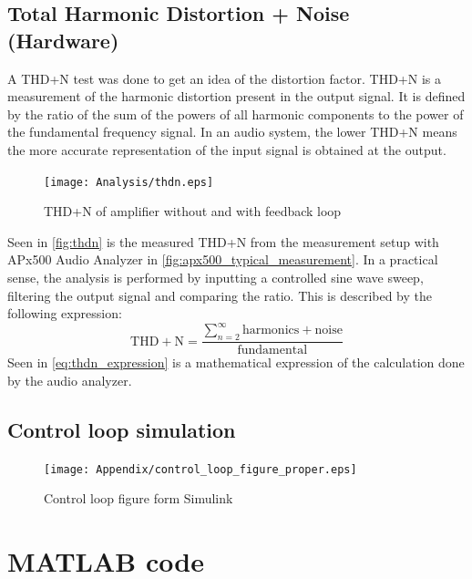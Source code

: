\section{Total Harmonic Distortion + Noise (Hardware)}
A THD+N test was done to get an idea of the distortion factor. THD+N is a measurement of the harmonic distortion present in the output signal. It is defined by the ratio of the sum of the powers of all harmonic components to the power of the fundamental frequency signal. In an audio system, the lower THD+N means the more accurate representation of the input signal is obtained at the output. \\

\begin{figure}[htbp]
	\centering
	\texttt{[image: Analysis/thdn.eps]}
	\caption{THD+N of amplifier without and with feedback loop}
	\label{fig:thdn}
\end{figure}
Seen in \autoref{fig:thdn} is the measured THD+N from the measurement setup with APx500 Audio Analyzer \cite{apx500_user_manual} in \autoref{fig:apx500_typical_measurement}. In a practical sense, the analysis is performed by inputting a controlled sine wave sweep, filtering the output signal and comparing the ratio. This is described by the following expression:
\begin{equation} \label{eq:thdn_expression}
	\mathrm{THD+N} = \frac{\sum_{n=2}^{\infty} \mathrm{harmonics + noise}}{\mathrm{fundamental}}
\end{equation}
Seen in \autoref{eq:thdn_expression} is a mathematical expression of the calculation done by the audio analyzer. 

\section{Control loop simulation}

\begin{figure}[htbp]
	\centering
	\texttt{[image: Appendix/control\_loop\_figure\_proper.eps]}
	\caption{Control loop figure form Simulink}
	\label{fig:control_loop_figure_proper}
\end{figure}

\chapter{MATLAB code}


